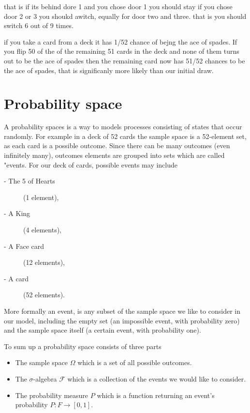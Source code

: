 \noindent that is if its behind dore 1 and you chose door 1 you should stay if you chose door 2 or 3 you shoukd awitch, equally for door two and three. that is you should switch 6 out of 9 times.


if you take a card from a deck it has 1/52 chance of bejng the ace of spades. If you flip 50 of the of the remaining 51 cards in the deck and none of them turns out to be the ace of spades then the remaining card now has 51/52 chances to be the ace of spades, that is significanly more likely than our initial draw.

\section{Probability space}
A probability spaces is a way to models processes consisting of states that occur randomly. For example in a deck of 52 cards the sample space is a 52-element set, as each card is a possible outcome. Since there can be many outcomes (even infinitely many), outcomes elements are grouped into sets which are called "events. For our deck of cards, possible events may include
\begin{description}
\item [- The 5 of Hearts] (1 element),
\item [- A King] (4 elements),
\item [- A Face card] (12 elements),
\item [- A card] (52 elements).
\end{description}
More formally an event, is any subset of the sample space we like to consider in our model, including the empty set (an impossible event, with probability zero) and the sample space itself (a certain event, with probability one).

\noindent To sum up a probability space consists of three parts
\begin{itemize}
\item The sample space $\Omega$ which is a set of all possible outcomes.
\item The $\sigma$-algebra $\mathcal{F}$ which is a collection of the events we would like to consider.
\item The probability measure $P$ which is a function returning an event's probability $P: F \rightarrow [0,1]$.
\end{itemize}

